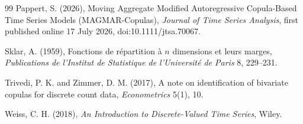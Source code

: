 \documentclass[11pt]{article}
\theoremstyle{definition}
\begin{document}
\begin{thebibliography}{99}
Pappert, S. (2026),
Moving Aggregate Modified Autoregressive Copula-Based Time Series Models
(MAGMAR-Copulas),
\emph{Journal of Time Series Analysis}, first published online 17 July 2026,
doi:10.1111/jtsa.70067.

Sklar, A. (1959),
Fonctions de r\'epartition \`a $n$ dimensions et leurs marges,
\emph{Publications de l'Institut de Statistique de l'Universit\'e de Paris}
8, 229--231.

Trivedi, P. K. and Zimmer, D. M. (2017),
A note on identification of bivariate copulas for discrete count data,
\emph{Econometrics} 5(1), 10.

Weiss, C. H. (2018),
\emph{An Introduction to Discrete-Valued Time Series},
Wiley.

\end{thebibliography}
\end{document}
